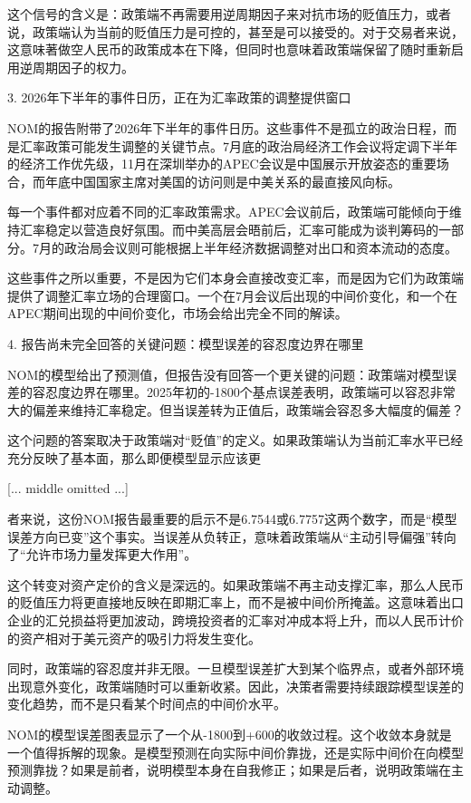 \documentclass[11pt]{ctexart}
\begin{document}
这个信号的含义是：政策端不再需要用逆周期因子来对抗市场的贬值压力，或者说，政策端认为当前的贬值压力是可控的，甚至是可以接受的。对于交易者来说，这意味著做空人民币的政策成本在下降，但同时也意味着政策端保留了随时重新启用逆周期因子的权力。

3. 2026年下半年的事件日历，正在为汇率政策的调整提供窗口

NOM的报告附带了2026年下半年的事件日历。这些事件不是孤立的政治日程，而是汇率政策可能发生调整的关键节点。7月底的政治局经济工作会议将定调下半年的经济工作优先级，11月在深圳举办的APEC会议是中国展示开放姿态的重要场合，而年底中国国家主席对美国的访问则是中美关系的最直接风向标。

每一个事件都对应着不同的汇率政策需求。APEC会议前后，政策端可能倾向于维持汇率稳定以营造良好氛围。而中美高层会晤前后，汇率可能成为谈判筹码的一部分。7月的政治局会议则可能根据上半年经济数据调整对出口和资本流动的态度。

这些事件之所以重要，不是因为它们本身会直接改变汇率，而是因为它们为政策端提供了调整汇率立场的合理窗口。一个在7月会议后出现的中间价变化，和一个在APEC期间出现的中间价变化，市场会给出完全不同的解读。

4. 报告尚未完全回答的关键问题：模型误差的容忍度边界在哪里

NOM的模型给出了预测值，但报告没有回答一个更关键的问题：政策端对模型误差的容忍度边界在哪里。2025年初的-1800个基点误差表明，政策端可以容忍非常大的偏差来维持汇率稳定。但当误差转为正值后，政策端会容忍多大幅度的偏差？

这个问题的答案取决于政策端对“贬值”的定义。如果政策端认为当前汇率水平已经充分反映了基本面，那么即便模型显示应该更

[... middle omitted ...]

者来说，这份NOM报告最重要的启示不是6.7544或6.7757这两个数字，而是“模型误差方向已变”这个事实。当误差从负转正，意味着政策端从“主动引导偏强”转向了“允许市场力量发挥更大作用”。

这个转变对资产定价的含义是深远的。如果政策端不再主动支撑汇率，那么人民币的贬值压力将更直接地反映在即期汇率上，而不是被中间价所掩盖。这意味着出口企业的汇兑损益将更加波动，跨境投资者的汇率对冲成本将上升，而以人民币计价的资产相对于美元资产的吸引力将发生变化。

同时，政策端的容忍度并非无限。一旦模型误差扩大到某个临界点，或者外部环境出现意外变化，政策端随时可以重新收紧。因此，决策者需要持续跟踪模型误差的变化趋势，而不是只看某个时间点的中间价水平。

NOM的模型误差图表显示了一个从-1800到+600的收敛过程。这个收敛本身就是一个值得拆解的现象。是模型预测在向实际中间价靠拢，还是实际中间价在向模型预测靠拢？如果是前者，说明模型本身在自我修正；如果是后者，说明政策端在主动调整。
\end{document}
